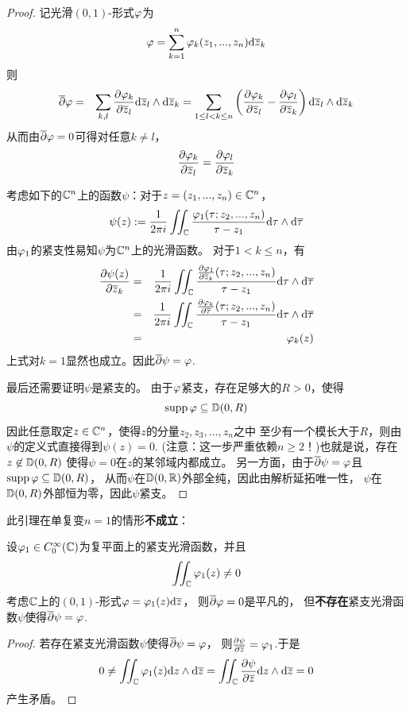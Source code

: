 \begin{proof}
记光滑$(0,1)$-形式$\varphi$为
$$\varphi=\sum_{k=1}^n\varphi_k(z_1,...,z_n)\mathrm{d}\overline{z}_k$$
则
\begin{eqnarray*}
     \overline{\partial}\varphi
&=&
     \sum_{k,l}
       \frac{\partial \varphi_k} {\partial \overline{z}_l}
       \mathrm{d}\overline{z}_l\wedge\mathrm{d}\overline{z}_k
 =
     \sum_{1\leq l<k\leq n}
       \left(
         \frac{\partial \varphi_k} {\partial \overline{z}_l}
        -\frac{\partial \varphi_l} {\partial \overline{z}_k}
       \right)
       \mathrm{d}\overline{z}_l\wedge\mathrm{d}\overline{z}_k
\end{eqnarray*}
从而由$\overline{\partial}\varphi=0$可得对任意$k\neq l$，
$$\frac{\partial \varphi_k} {\partial \overline{z}_l}=\frac{\partial \varphi_l} {\partial \overline{z}_k}$$

考虑如下的$\mathbb{C}^n$上的函数$\psi$：对于$z=(z_1,...,z_n)\in\mathbb{C}^n$，
$$
  \psi(z)
:=
  \frac{1}{2\pi i}
  \iint_{\mathbb{C}}
    \frac{\varphi_1(\tau;z_2,...,z_n)}
         {\tau-z_1}
    \mathrm{d}\tau\wedge\mathrm{d}\overline{\tau}
$$
由$\varphi_1$的紧支性易知$\psi$为$\mathbb{C}^n$上的光滑函数。
对于$1<k\leq n$，有
\begin{eqnarray*}
     \frac{\partial \psi(z)} {\partial \overline{z}_k}
&=&
     \frac{1}{2\pi i}
     \iint_{\mathbb{C}}
       \frac{\frac{\partial \varphi_1} {\partial \overline{z}_k}(\tau;z_2,...,z_n)}
            {\tau-z_1}
       \mathrm{d}\tau\wedge\mathrm{d}\overline{\tau}\\
&=&
     \frac{1}{2\pi i}
     \iint_{\mathbb{C}}
       \frac{\frac{\partial \varphi_k} {\partial \overline{\tau}}(\tau;z_2,...,z_n)}
            {\tau-z_1}
       \mathrm{d}\tau\wedge\mathrm{d}\overline{\tau}\\
&=&
    \varphi_k(z)
\end{eqnarray*}
上式对$k=1$显然也成立。因此$\overline{\partial}\psi=\varphi$.

最后还需要证明$\psi$是紧支的。
由于$\varphi$紧支，存在足够大的$R>0$，使得
$$\operatorname{supp}\varphi\subseteq \mathbb{D}(0,R)$$
因此任意取定$z\in\mathbb{C}^n$，使得$z$的分量$z_2,z_3,...,z_n$之中
至少有一个模长大于$R$，则由$\psi$的定义式直接得到$\psi(z)=0$.
(注意：这一步严重依赖$n\geq 2$！)也就是说，存在$z\not\in\mathbb{D}(0,R)$
使得$\psi=0$在$z$的某邻域内都成立。
另一方面，由于$\overline{\partial}\psi=\varphi$且$\operatorname{supp}\varphi\subseteq\mathbb{D}(0,R)$，
从而$\psi$在$\mathbb{D}(0,\mathbb{R})$外部全纯，因此由解析延拓唯一性，
$\psi$在$\mathbb{D}(0,R)$外部恒为零，因此$\psi$紧支。
\end{proof}

此引理在单复变$n=1$的情形\textbf{不成立}：
\begin{example}
设$\varphi_1\in C_0^\infty(\mathbb{C})$为复平面上的紧支光滑函数，并且
$$\iint_{\mathbb{C}}\varphi_1(z)\neq 0$$
考虑$\mathbb{C}$上的$(0,1)$-形式$\varphi=\varphi_1(z)\mathrm{d}\overline{z}$，
则$\overline{\partial}\varphi=0$是平凡的，
但\textbf{不存在}紧支光滑函数$\psi$使得$\overline{\partial}\psi=\varphi$.
\end{example}

\begin{proof}
若存在紧支光滑函数$\psi$使得$\overline{\partial}\psi=\varphi$，
则$\frac{\partial \psi} {\partial \overline{z}}=\varphi_1$.于是
$$
  0\neq
  \iint_{\mathbb{C}}
    \varphi_1(z)\mathrm{d} z\wedge\mathrm{d}\overline{z}
=
  \iint_{\mathbb{C}}
    \frac{\partial \psi} {\partial \overline{z}}
    \mathrm{d} z\wedge\mathrm{d}\overline{z}
=0
$$
产生矛盾。
\end{proof}

